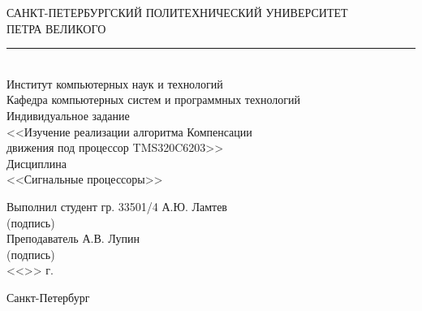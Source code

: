 \begin{titlepage}
\begin{center}
	САНКТ-ПЕТЕРБУРГСКИЙ ПОЛИТЕХНИЧЕСКИЙ УНИВЕРСИТЕТ\\ ПЕТРА ВЕЛИКОГО\\[0.3cm]
	\par\noindent\rule{10cm}{0.4pt}\\[0.3cm]
	Институт компьютерных наук и технологий \\[0.3cm]
	Кафедра компьютерных систем и программных технологий\\[4cm]
	
	\Large Индивидуальное задание\\ <<Изучение реализации алгоритма Компенсации\\ движения под процессор TMS320C6203>>\\[3mm]
	\Large Дисциплина\\ <<Сигнальные процессоры>>\\[7cm]
\end{center}

\begin{flushleft}
	\hspace*{5mm} Выполнил студент гр. 33501/4  \hspace*{3.85cm}\sign[3cm]\hspace*{2.45mm} А.Ю. Ламтев\\
	\hspace*{11cm} (подпись)\\[3mm]
	\hspace*{5mm} Преподаватель \hspace*{6.8cm}\sign[3cm]\hspace*{2mm} А.В. Лупин\\
	\hspace*{11cm} (подпись)\\[3mm]
	\hspace*{11.1cm} <<\sign[7mm]>> \sign[27mm] \the\year\hspace{1mm} г.
\end{flushleft}

\vfill

\begin{center}
	Санкт-Петербург\\
	\the\year
\end{center}
\end{titlepage}
\addtocounter{page}{1}